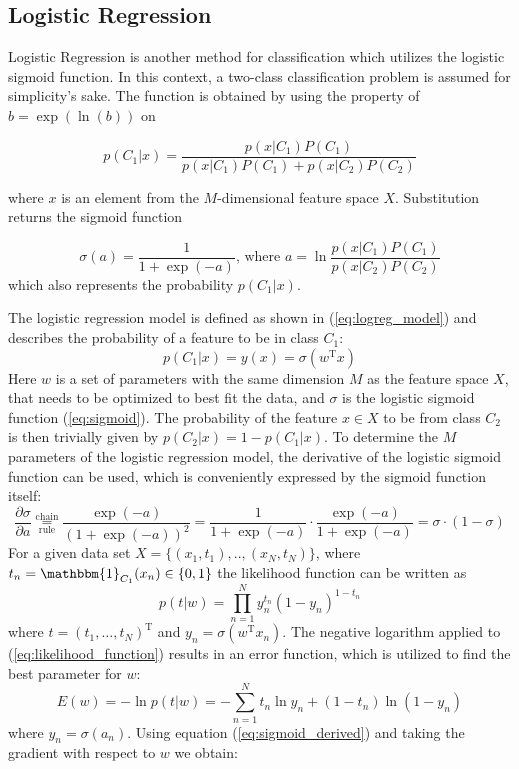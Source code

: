 \subsection{Logistic Regression}\label{subsec:lr}
Logistic Regression is another method for classification which utilizes the logistic sigmoid function. In this context, a two-class classification problem is assumed for simplicity's sake. The function is obtained by using the property of $b = \exp(\ln(b))$ on 

\begin{equation}
	p(C_1|x)  = \frac{p(x|C_1)P(C_1)}{p(x|C_1)P(C_1)+p(x|C_2)P(C_2)}
\end{equation}

where $x$ is an element from the $M$-dimensional feature space $X$. Substitution returns the sigmoid function 

\begin{equation} \label{eq:sigmoid}
\sigma(a) = \frac{1}{1 + \exp(-a)} \text{, where } a = \ln\frac{p(x|C_1)P(C_1)}{p(x|C_2)P(C_2)}
\end{equation}
which also represents the probability $p(C_1|x)$. 

The logistic regression model is defined as shown in (\ref{eq:logreg_model}) and describes the probability of a feature to be in class $C_1$:
\begin{equation} \label{eq:logreg_model}
p(C_1|x) = y(x) = \sigma(w^\text{T}x)
\end{equation}
Here $w$ is a set of parameters with the same dimension $M$ as the feature space $X$, that needs to be optimized to best fit the data, and $\sigma$ is the logistic sigmoid function (\ref{eq:sigmoid}). The probability of the feature $x \in X$ to be from class $C_2$ is then trivially given by $p(C_2|x) = 1 - p(C_1|x)$. To determine the $M$ parameters of the logistic regression model, the derivative of the logistic sigmoid function can be used, which is conveniently expressed by the sigmoid function itself:
\begin{equation} \label{eq:sigmoid_derived}
\frac{\partial \sigma}{\partial a} \overset{\text{chain}}{\underset{\text{rule}}{=}} \frac{\exp(-a)}{(1+\exp(-a))^2} = \frac{1}{1+\exp(-a)} \cdot \frac{\exp(-a)}{1+\exp(-a)}= \sigma \cdot(1-\sigma)
\end{equation}
For a given data set $X = \{(x_1,t_1), .. , (x_N,t_N)\}$, where $t_n = \mathbbm{1}_{C_1}(x_n) \in \{0,1\}$ the likelihood function can be written as
\begin{equation} \label{eq:likelihood_function}
p(t|w)=\prod_{n=1}^{N}y_n^{t_n} (1-y_n)^{1-t_n}
\end{equation}
where $t=(t_1, \dots, t_N)^\text{T}$ and $y_n = \sigma(w^\text{T}x_n)$. 
The negative logarithm applied to (\ref{eq:likelihood_function}) results in an error function, which is utilized to find the best parameter for $w$:
\begin{equation} \label{eq:likelihood_function}
E(w)=-\ln p(t|w) = - \sum_{n=1}^{N}t_n \ln y_n + (1-t_n) \ln (1-y_n)
\end{equation}
where $y_n=\sigma(a_n)$. Using equation (\ref{eq:sigmoid_derived}) and taking the gradient with respect to $w$ we obtain:

